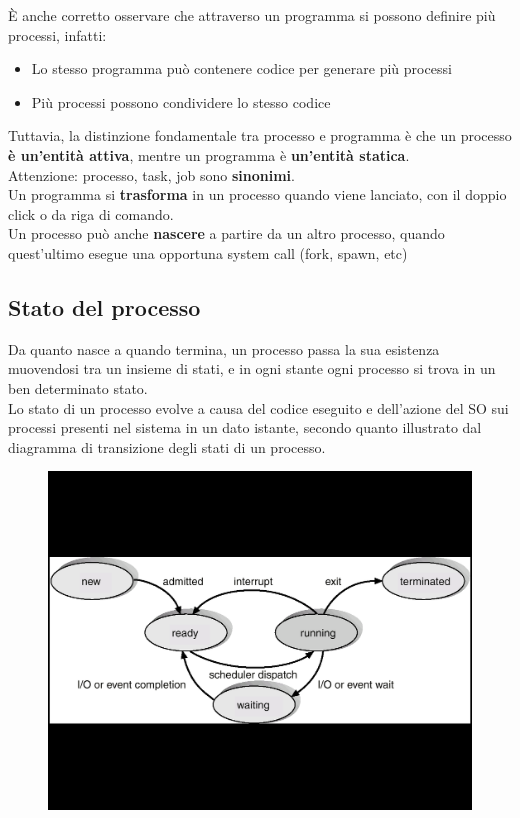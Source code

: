      È anche corretto osservare che attraverso un programma si possono definire più processi, infatti:
    \begin{itemize}
        \item Lo stesso programma può contenere codice per generare più processi
        \item Più processi possono condividere lo stesso codice
    \end{itemize}
Tuttavia, la distinzione fondamentale tra processo e programma è che un processo \textbf{è un'entità attiva}, mentre un programma è \textbf{un'entità statica}.\\
Attenzione: processo, task, job sono \textbf{sinonimi}.\\

Un programma si \textbf{trasforma} in un processo quando viene lanciato, con il doppio click o da riga di comando.\\
Un processo può anche \textbf{nascere} a partire da un altro processo, quando quest’ultimo esegue una opportuna system call (fork, spawn, etc)\\

\subsection{Stato del processo}
Da quanto nasce a quando termina, un processo passa la sua esistenza muovendosi tra un insieme di stati, e in ogni stante ogni processo si trova in un ben determinato stato. \\
Lo stato di un processo evolve a causa del codice eseguito e dell’azione del SO sui processi presenti nel sistema in un dato istante, secondo quanto illustrato dal diagramma di transizione degli stati di un processo.\\

\begin{figure}[h]
    \centering
    \includegraphics[width=0.5\linewidth]{images/StatoProcesso.png}
\end{figure}

